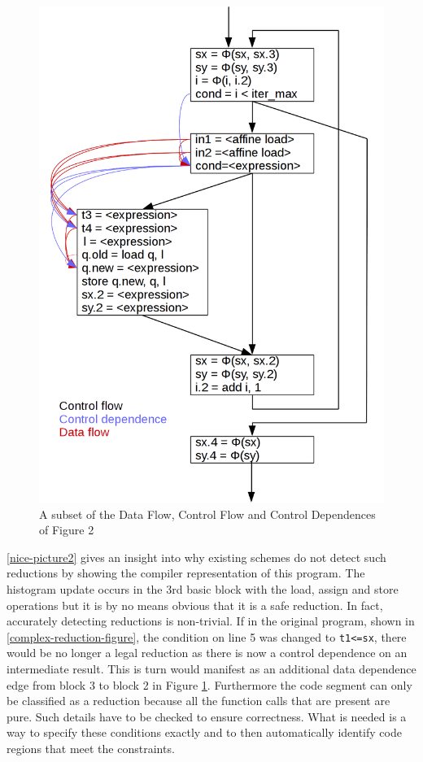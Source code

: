 \begin{figure}[p]
\centering
\includegraphics[width=\textwidth]{figures/nicepicture2.png}
\caption{A subset of the Data Flow, Control Flow and Control Dependences of Figure 2}
\label{nice-picture2}
\end{figure}

    \autoref{nice-picture2} gives an insight into why existing schemes do not
    detect such reductions by showing the compiler representation of this 
    program.
    The histogram update occurs in the 3rd basic block with the load, assign and
    store operations but it is by no means obvious that it is a safe reduction.
    In fact, accurately detecting reductions is non-trivial.
    If in the original program, shown in \autoref{complex-reduction-figure}, the
    condition on line 5 was changed to {\tt t1<=sx}, there would be no longer a
    legal reduction as there is now a control dependence on an intermediate
    result.
    This is turn would manifest as an additional data dependence edge from
    block 3 to block 2 in Figure \ref{nice-picture2}.
    Furthermore the code segment can only be classified as a reduction because
    all the function calls that are present are pure.
    Such details have to be checked to ensure correctness.
    What is needed is a way to specify these conditions exactly and to then
    automatically identify code regions that meet the constraints.

